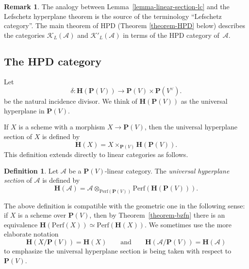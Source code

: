 \documentclass[11pt, reqno]{amsart}
\numberwithin{equation}{section}
\theoremstyle{plain}
\theoremstyle{definition}
\newtheorem{definition}[theorem]{Definition}
\newtheorem{remark}[theorem]{Remark}
\newcommand{\Perf}{\mathrm{Perf}}
\newcommand{\svee}{\scriptscriptstyle\vee}
\newcommand{\stimes}{\times}
\newcommand{\vV}{V^{\svee}}
\newcommand{\cA}{\mathcal{A}}
\newcommand{\cK}{\mathcal{K}}
\newcommand{\bH}{\mathbf{H}}
\newcommand{\bP}{\mathbf{P}}
\begin{document}
\begin{remark}
The analogy between Lemma~\ref{lemma-linear-section-lc} and the Lefschetz 
hyperplane theorem is the source of the terminology ``Lefschetz category''.  
The main theorem of HPD (Theorem \ref{theorem-HPD} below) 
describes the categories $\cK_L(\cA)$ and $\cK'_{L}(\cA)$ in terms of the HPD category of~$\cA$. 
\end{remark}


\subsection{The HPD category} 
\label{subsection-HPD}

Let 
\begin{equation*}
\delta \colon \bH(\bP(V)) \to \bP(V) \stimes \bP(\vV). 
\end{equation*} 
be the natural incidence divisor.
We think of $\bH(\bP(V))$ as the universal hyperplane in $\bP(V)$.
  
If $X$ is a scheme with a morphism $X \to \bP(V)$, 
then the universal hyperplane section of $X$ is defined by 
\begin{equation*}
\bH(X) = X \times_{\bP(V)} \bH(\bP(V)). 
\end{equation*} 
This definition extends directly to linear categories as follows.  
 
\begin{definition}
Let $\cA$ be a $\bP(V)$-linear category. 
The \emph{universal hyperplane section} of $\cA$ is defined by 
\begin{equation*}
\bH(\cA) = \cA \otimes_{\Perf(\bP(V))} \Perf(\bH(\bP(V))). 
\end{equation*} 
\end{definition} 

The above definition is compatible with the geometric one in the following sense: 
if $X$ is a scheme over $\bP(V)$, then by Theorem~\ref{theorem-bzfn} there is an equivalence
$\bH(\Perf(X)) \simeq \Perf(\bH(X))$. 
We sometimes use the more elaborate notation 
\begin{equation*}
\bH(X/\bP(V)) = \bH(X) 
\qquad\text{and}\qquad 
\bH(\cA/\bP(V)) = \bH(\cA) 
\end{equation*}
to emphasize the universal hyperplane section is being taken with respect to $\bP(V)$.
\end{document}

